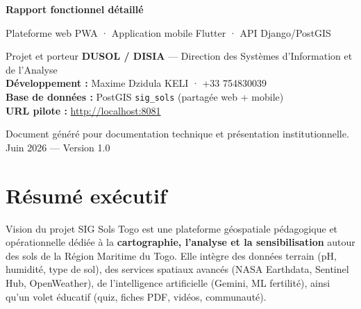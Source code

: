 \documentclass[11pt,a4paper]{report}
\begin{document}
\begin{titlepage}
  \vspace*{9cm}
  {\LARGE\bfseries\color{DusolVert} Rapport fonctionnel détaillé\par}
  \vspace{0.8cm}
  {\large Plateforme web PWA · Application mobile Flutter · API Django/PostGIS\par}
  \vspace{1.5cm}
  \begin{infobox}{Projet et porteur}
    \textbf{DUSOL / DISIA} — Direction des Systèmes d'Information et de l'Analyse\\
    \textbf{Développement :} Maxime Dzidula KELI · +33 754830039\\
    \textbf{Base de données :} PostGIS \texttt{sig\_sols} (partagée web + mobile)\\
    \textbf{URL pilote :} \url{http://localhost:8081}
  \end{infobox}
  \vfill
  {\small\color{gray} Document généré pour documentation technique et présentation institutionnelle.\\
  Juin 2026 — Version 1.0}
\end{titlepage}

\tableofcontents
\listoffigures
\clearpage

\chapter{Résumé exécutif}

\begin{infobox}{Vision du projet}
SIG Sols Togo est une plateforme géospatiale pédagogique et opérationnelle dédiée à la
\textbf{cartographie, l'analyse et la sensibilisation} autour des sols de la Région Maritime du Togo.
Elle intègre des données terrain (pH, humidité, type de sol), des services spatiaux avancés
(NASA Earthdata, Sentinel Hub, OpenWeather), de l'intelligence artificielle (Gemini, ML fertilité),
ainsi qu'un volet éducatif (quiz, fiches PDF, vidéos, communauté).
\end{infobox}
\end{document}
